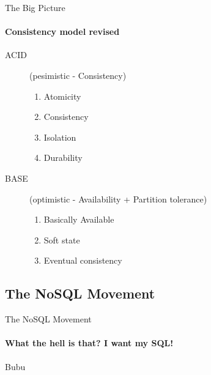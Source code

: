 \documentclass{beamer}
\begin{document}
\begin{frame}{The Big Picture}
  \framesubtitle{Consistency model revised}
  \begin{description}
    \item[ACID] (pesimistic - Consistency) \hfill \\
    \begin{enumerate}
      \item Atomicity
      \item Consistency
      \item Isolation
      \item Durability
    \end{enumerate}
    \item[BASE] (optimistic - Availability + Partition tolerance) \hfill \\
    \begin{enumerate}
      \item Basically Available
      \item Soft state
      \item Eventual consistency
    \end{enumerate}
  \end{description} 
\end{frame}

\subsection{The NoSQL Movement}
\begin{frame}{The NoSQL Movement}
  \framesubtitle{What the hell is that? I want my SQL!}
  Bubu
\end{frame}
\end{document}
